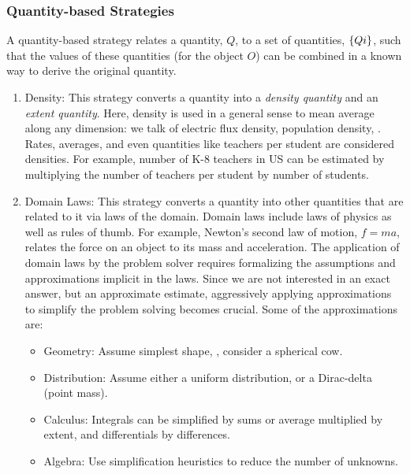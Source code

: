 \subsubsection{Quantity-based Strategies}
A quantity-based strategy relates a quantity, $Q$, to a set of quantities, $\left\lbrace{Qi}\right\rbrace$, such that the values of these quantities (for the object $O$) can be combined in a known way to derive the original quantity. 
%
\begin{enumerate}
\item Density: This strategy converts a quantity into a \emph{density quantity} and an \emph{extent quantity}. Here, density is used in a general sense to mean average along any dimension: we talk of electric flux density, population density, \etc. Rates, averages, and even quantities like teachers per student are considered densities. For example, number of K-8 teachers in US can be estimated by multiplying the number of teachers per student by number of students.
%
\item Domain Laws: This strategy converts a quantity into other quantities that are related to it via laws of the domain. Domain laws include laws of physics as well as rules of thumb. For example, Newton's second law of motion, $f = ma$, relates the force on an object to its mass and acceleration. The application of domain laws by the problem solver requires formalizing the assumptions and approximations implicit in the laws. Since we are not interested in an exact answer, but an approximate estimate, aggressively applying approximations to simplify the problem solving becomes crucial. Some of the approximations are:
%
\begin{itemize}
\item Geometry: Assume simplest shape, \eg, consider a spherical cow.
%
\item Distribution: Assume either a uniform distribution, or a Dirac-delta (point mass).
%
\item Calculus: Integrals can be simplified by sums or average multiplied by extent, and differentials by differences.
%
\item Algebra: Use simplification heuristics to reduce the number of unknowns.
\end{itemize}
\end{enumerate}


